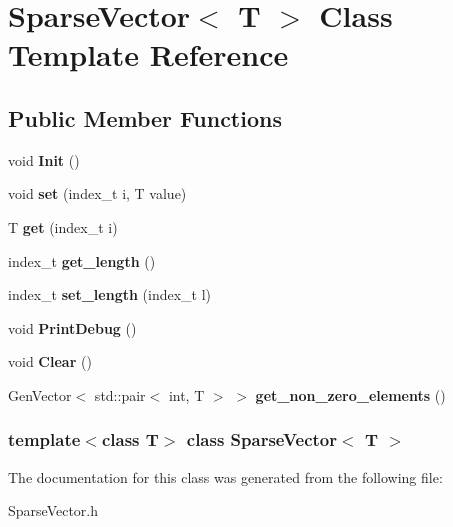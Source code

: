 \hypertarget{classSparseVector}{
\section{SparseVector$<$ T $>$ Class Template Reference}
\label{classSparseVector}
}
\subsection*{Public Member Functions}
\begin{DoxyCompactItemize}
\item 
\hypertarget{classSparseVector_ab788af71b6d2dd35d215ee13d3398c2a}{
void {\bfseries Init} ()}
\label{classSparseVector_ab788af71b6d2dd35d215ee13d3398c2a}

\item 
\hypertarget{classSparseVector_a9cf4c638feb0d01f0afd2fec526bbcdf}{
void {\bfseries set} (index\_\-t i, T value)}
\label{classSparseVector_a9cf4c638feb0d01f0afd2fec526bbcdf}

\item 
\hypertarget{classSparseVector_a5c1cab355d9298fa455db723a1893302}{
T {\bfseries get} (index\_\-t i)}
\label{classSparseVector_a5c1cab355d9298fa455db723a1893302}

\item 
\hypertarget{classSparseVector_af1f4d74a7eb1234d69b177b97cd9b4ef}{
index\_\-t {\bfseries get\_\-length} ()}
\label{classSparseVector_af1f4d74a7eb1234d69b177b97cd9b4ef}

\item 
\hypertarget{classSparseVector_a668b4788d9a0d262c87282b09c37735c}{
index\_\-t {\bfseries set\_\-length} (index\_\-t l)}
\label{classSparseVector_a668b4788d9a0d262c87282b09c37735c}

\item 
\hypertarget{classSparseVector_a25730e33602eef6cbd4af269cdec0e0d}{
void {\bfseries PrintDebug} ()}
\label{classSparseVector_a25730e33602eef6cbd4af269cdec0e0d}

\item 
\hypertarget{classSparseVector_af5503d02bf2501e5dfba45d551cefcf0}{
void {\bfseries Clear} ()}
\label{classSparseVector_af5503d02bf2501e5dfba45d551cefcf0}

\item 
\hypertarget{classSparseVector_a503fd42d3955972a922e8e247c53a13f}{
GenVector$<$ std::pair$<$ int, T $>$ $>$ {\bfseries get\_\-non\_\-zero\_\-elements} ()}
\label{classSparseVector_a503fd42d3955972a922e8e247c53a13f}

\end{DoxyCompactItemize}
\subsubsection*{template$<$class T$>$ class SparseVector$<$ T $>$}



The documentation for this class was generated from the following file:\begin{DoxyCompactItemize}
\item 
SparseVector.h\end{DoxyCompactItemize}

